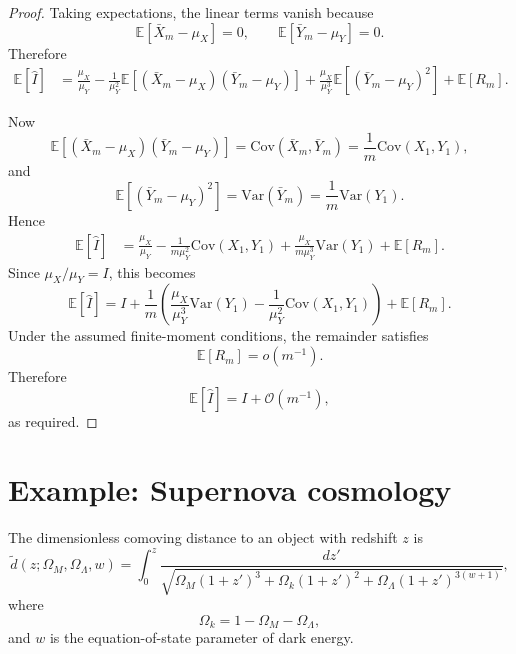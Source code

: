 \documentclass[11pt, titlepage]{article} %
\numberwithin{equation}{section}
\theoremstyle{definition}
\numberwithin{assumption}{section}
\begin{document}
\begin{proof}
Taking expectations, the linear terms vanish because
\begin{equation*}
    \mathbb{E}[\bar X_m-\mu_X]=0,
    \qquad
    \mathbb{E}[\bar Y_m-\mu_Y]=0.
\end{equation*}
Therefore
\begin{align*}
    \mathbb{E}[\hat I]
    &=
    \frac{\mu_X}{\mu_Y}
    -\frac{1}{\mu_Y^2}\mathbb{E}\!\left[(\bar X_m-\mu_X)(\bar Y_m-\mu_Y)\right]
    +\frac{\mu_X}{\mu_Y^3}\mathbb{E}\!\left[(\bar Y_m-\mu_Y)^2\right]
    +\mathbb{E}[R_m].
\end{align*}

Now
\begin{equation*}
    \mathbb{E}\!\left[(\bar X_m-\mu_X)(\bar Y_m-\mu_Y)\right]
    =\mathrm{Cov}(\bar X_m,\bar Y_m)
    =\frac{1}{m}\mathrm{Cov}(X_1,Y_1),
\end{equation*}
and
\begin{equation*}
    \mathbb{E}\!\left[(\bar Y_m-\mu_Y)^2\right]
    =\mathrm{Var}(\bar Y_m)
    =\frac{1}{m}\mathrm{Var}(Y_1).
\end{equation*}
Hence
\begin{align*}
    \mathbb{E}[\hat I]
    &=
    \frac{\mu_X}{\mu_Y}
    -\frac{1}{m\mu_Y^2}\mathrm{Cov}(X_1,Y_1)
    +\frac{\mu_X}{m\mu_Y^3}\mathrm{Var}(Y_1)
    +\mathbb{E}[R_m].
\end{align*}
Since $\mu_X/\mu_Y=I$, this becomes
\begin{equation*}
    \mathbb{E}[\hat I]
    =
    I
    +\frac{1}{m}\left(
    \frac{\mu_X}{\mu_Y^3}\mathrm{Var}(Y_1)
    -\frac{1}{\mu_Y^2}\mathrm{Cov}(X_1,Y_1)
    \right)
    +\mathbb{E}[R_m].
\end{equation*}
Under the assumed finite-moment conditions, the remainder satisfies
\begin{equation*}
    \mathbb{E}[R_m]=o(m^{-1}).
\end{equation*}
Therefore
\begin{equation*}
    \mathbb{E}[\hat I]=I+\mathcal{O}(m^{-1}),
\end{equation*}
as required.
\end{proof}


\section{Example: Supernova cosmology}
The dimensionless comoving distance to an object with redshift $z$ is
\begin{equation*}
    \tilde d(z;\Omega_M,\Omega_\Lambda,w)
    =
    \int_0^z
    \frac{dz'}
    {\sqrt{\Omega_M(1+z')^3+\Omega_k(1+z')^2+\Omega_\Lambda(1+z')^{3(w+1)}}},
\end{equation*}
where
\begin{equation*}
    \Omega_k=1-\Omega_M-\Omega_\Lambda,
\end{equation*}
and $w$ is the equation-of-state parameter of dark energy.
\end{document}
